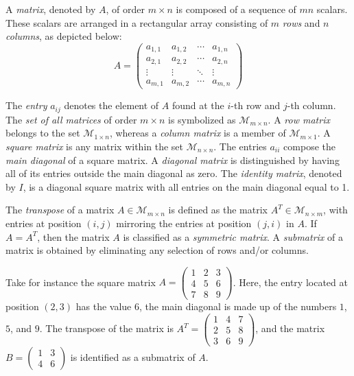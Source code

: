 A \emph{matrix}, denoted by $A$, of order $m \times n$ is composed of a sequence of $mn$ scalars. These scalars are arranged in a rectangular array consisting of $m$ \emph{rows} and $n$ \emph{columns}, as depicted below:
\[
A = 
 \begin{pmatrix}
  a_{1,1} & a_{1,2} & \cdots & a_{1,n} \\
  a_{2,1} & a_{2,2} & \cdots & a_{2,n} \\
  \vdots  & \vdots  & \ddots & \vdots  \\
  a_{m,1} & a_{m,2} & \cdots & a_{m,n} 
 \end{pmatrix}
\]

The \emph{entry} $a_{ij}$ denotes the element of $A$ found at the $i$-th row and $j$-th column. The \emph{set of all matrices} of order $m \times n$ is symbolized as $\mathcal{M}_{m \times n}$. A \emph{row matrix} belongs to the set $\mathcal{M}_{1 \times n}$, whereas a \emph{column matrix} is a member of $\mathcal{M}_{m \times 1}$. A \emph{square matrix} is any matrix within the set $\mathcal{M}_{n \times n}$. The entries $a_{ii}$ compose the \emph{main diagonal} of a square matrix. A \emph{diagonal matrix} is distinguished by having all of its entries outside the main diagonal as zero. The \emph{identity matrix}, denoted by $I$, is a diagonal square matrix with all entries on the main diagonal equal to 1.

The \emph{transpose} of a matrix $A \in \mathcal{M}_{m \times n}$ is defined as the matrix $A^T \in \mathcal{M}_{n \times m}$, with entries at position $(i,j)$ mirroring the entries at position $(j, i)$ in $A$. If $A = A^T$, then the matrix $A$ is classified as a \emph{symmetric matrix}. A \emph{submatrix} of a matrix is obtained by eliminating any selection of rows and/or columns.

\begin{example}
Take for instance the square matrix $A = \left( \begin{smallmatrix} 1 & 2 & 3 \\ 4 & 5 & 6 \\ 7 & 8 & 9 \end{smallmatrix} \right)$. Here, the entry located at position $(2, 3)$ has the value $6$, the main diagonal is made up of the numbers $1$, $5$, and $9$. The transpose of the matrix is $A^T = \left( \begin{smallmatrix} 1 & 4 & 7 \\ 2 & 5 & 8 \\ 3 & 6 & 9 \end{smallmatrix} \right)$, and the matrix $B = \left( \begin{smallmatrix} 1 & 3 \\ 4 & 6 \end{smallmatrix} \right)$ is identified as a submatrix of $A$.
\end{example}

